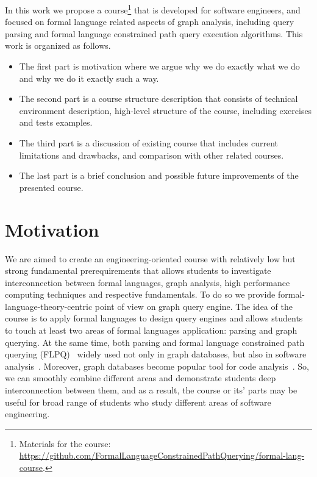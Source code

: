 \documentclass[sigconf]{acmart}
\begin{document}
In this work we propose a course\footnote{Materials for the course: \url{https://github.com/FormalLanguageConstrainedPathQuerying/formal-lang-course}.} that is developed for software engineers, and focused on formal language related aspects of graph analysis, including query parsing and formal language constrained path query execution algorithms.
This work is organized as follows.
\begin{itemize}
  \item The first part is motivation where we argue why we do exactly what we do and why we do it exactly such a way. 
  \item The second part is a course structure description that consists of technical environment description, high-level structure of the course, including exercises and tests examples.
  \item The third part is a discussion of existing course that includes current limitations and drawbacks, and comparison with other related courses.
  \item The last part is a brief conclusion and possible future improvements of the presented course.
\end{itemize}  

\section{Motivation}

We are aimed to create an engineering-oriented course with relatively low but strong fundamental prerequirements that allows students to investigate interconnection between formal languages, graph analysis, high performance computing techniques and respective fundamentals.
To do so we provide formal-language-theory-centric point of view on graph query engine.
The idea of the course is to apply formal languages to design query engines and allows students to touch at least two areas of formal languages application: parsing and graph querying.
At the same time, both parsing and formal language constrained path querying (FLPQ)~\cite{10.1137/S0097539798337716} widely used not only in graph databases, but also in software analysis~\cite{10.1145/3583660.3583664}.
Moreover, graph databases become popular tool for code analysis~\cite{URMA2015127}.
So, we can smoothly combine different areas and demonstrate students deep interconnection between them, and as a result, the course or its' parts may be useful for broad range of students who study different areas of software engineering.
\end{document}
